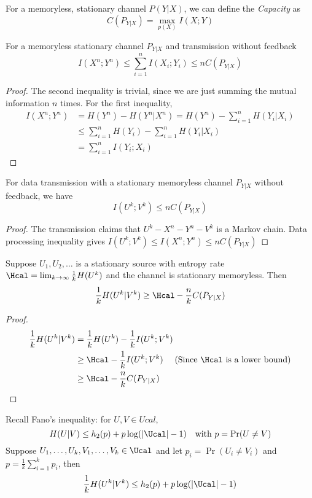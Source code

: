\begin{definition}[Capacity]
For a memoryless, stationary channel $P(Y|X)$, we can define the \textit{Capacity} as 
\[C(P_{Y|X}) = \max_{p(X)} I(X;Y)\]
\end{definition}
\begin{theorem}
For a memoryless stationary channel $P_{Y|X}$ and transmission without feedback
\[I(X^n;Y^n) \leq \sum_{i=1}^n I(X_i;Y_i) \leq n C(P_{Y|X})\]
\end{theorem}
\begin{proof}
The second inequality is trivial, since we are just summing the mutual information $n$ times. For the first inequality,
\begin{align*}
    I(X^n;Y^n) &= H(Y^n) - H(Y^n|X^n) = H(Y^n) - \sum_{i=1}^n H(Y_i|X_i) \\
    &\leq \sum_{i=1}^n H(Y_i) - \sum_{i=1}^n H(Y_i|X_i) \\
    &= \sum_{i=1}^n I(Y_i;X_i)
\end{align*}
\end{proof}
\begin{corollary}
    For data transmission  with a stationary memoryless channel $P_{Y|X}$ without feedback, we have
    \[I(U^k; V^k) \leq n C(P_{Y|X})\]
\end{corollary}
\begin{proof}
    The transmission claims that $U^k - X^n - Y^n - V^k$ is a Markov chain. Data processing inequality gives $I(U^k; V^k) \leq I(X^n; Y^n) \leq nC(P_{Y|X})$
\end{proof}
\begin{theorem}
Suppose $U_1, U_2, \dots$ is a stationary source with entropy rate $\Hcal = \lim_{k\to\infty} \frac{1}{k} H(U^k)$ and the channel is stationary memoryless. Then
\[\frac{1}{k} H(U^k|V^k) \geq \Hcal - \frac{n}{k} C(P_{Y|X})\]
\end{theorem}
\begin{proof}
    \begin{align*}
        \frac{1}{k} H(U^k|V^k) &= \frac{1}{k} H(U^k) - \frac{1}{k} I(U^k;V^k)\\
        &\geq \Hcal - \frac{1}{k} I(U^k;V^k) \quad \text{ (Since $\Hcal$ is a lower bound)} \\
        &\geq \Hcal - \frac{n}{k} C(P_{Y|X})
    \end{align*}
\end{proof}
\begin{lemma}
Recall Fano's inequality: for $U, V \in Ucal$, 
\[H(U|V) \leq h_2(p) + p\log(|\Ucal| - 1) \quad \text{with }p=\Pr(U\neq V)\]
Suppose $U_1, \dots, U_k, V_1, \dots, V_k \in \Ucal$ and let $p_i = \Pr(U_i \neq V_i)$ and $p = \frac1k \sum_{i=1}^k p_i$, then
\[\frac{1}{k} H(U^k|V^k) \leq h_2(p) + p\log(|\Ucal| - 1)\]
\end{lemma}
